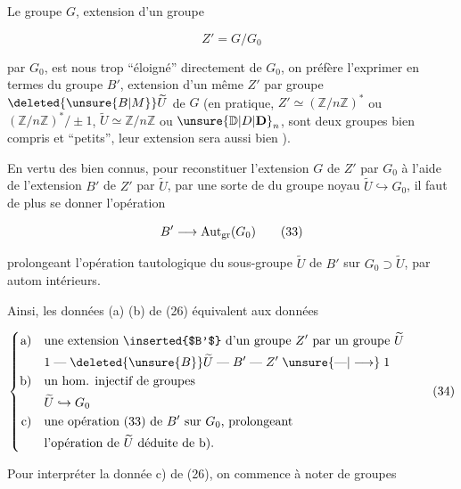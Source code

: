 Le groupe $G$, extension d'un groupe


\[ Z'=G/G_0 \tag*{(32)} \]

par $G_0$, est  nous trop ``éloigné'' directement de $G_0$, on préfère l'exprimer en termes du groupe $B'$, extension d'un même $Z'$ par   groupe $\deleted{\unsure{B|M}}\widetilde U$ de $G$ (en pratique, $Z'\simeq(\mathbb Z/n\mathbb Z)^*$ ou $(\mathbb Z/n\mathbb Z)^*/\pm1$, $\widetilde U\simeq\mathbb Z/n\mathbb Z$ ou $\unsure{\mathbb D|D|\mathbf D}_n$, sont deux groupes bien compris et ``petits'', leur extension sera aussi bien ).

En vertu des  bien connus, pour reconstituer l'extension $G$ de $Z'$ par $G_0$ à l'aide de l'extension $B'$ de $Z'$ par $\widetilde U$, par une sorte de   du groupe noyau $\widetilde U\hookrightarrow G_0$, il faut de plus se donner l'opération

\[ B'\mathrel{\longrightarrow}\operatorname{Aut}_{\rm gr}(G_0) \tag*{(33)} \]

prolongeant l'opération tautologique du sous-groupe $\widetilde U$ de $B'$ sur $G_0\supset\widetilde U$, par autom intérieurs.

Ainsi, les données (a) (b) de (26) équivalent aux données

\[
\left\{\begin{aligned}
\text{a)}\quad&\text{une extension \inserted{$B'$} d'un groupe $Z'$ par un groupe $\widetilde U$}\\
 &1\mathrel{\text{---}}\deleted{\unsure{B}}\widetilde U\mathrel{\text{---}}B'\mathrel{\text{---}}Z'\mathrel{\unsure{\text{---}|\longrightarrow}}1\\
\text{b)}\quad&\text{un hom. injectif de groupes}\\
 &\widetilde U\hookrightarrow G_0\\
\text{c)}\quad&\text{une opération (33) de $B'$ sur $G_0$, prolongeant}\\
 &\text{l'opération de $\widetilde U$ déduite de b).}
\end{aligned}\right.\tag*{(34)}
\]

Pour interpréter la donnée c) de (26), on commence à noter   de groupes


